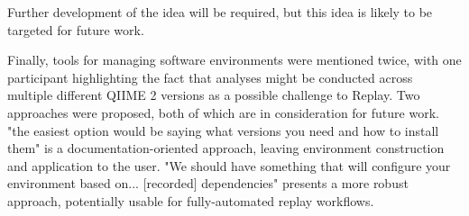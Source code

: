 \noindent Further development of the idea will be required, but this idea is likely to be
targeted for future work.

Finally, tools for managing software environments were mentioned twice, with one
participant highlighting the fact that analyses might be conducted across
multiple different QIIME 2 versions as a possible challenge to Replay. Two
approaches were proposed, both of which are in consideration for future work.
"the easiest option would be saying what versions you need and how to install
them" is a documentation-oriented approach, leaving environment construction and
application to the user. "We should have something that will configure your
environment based on... [recorded] dependencies" presents a more robust
approach, potentially usable for fully-automated replay workflows.
